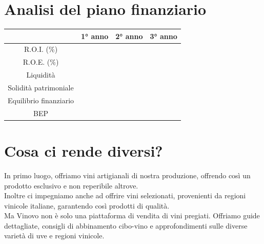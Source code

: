 \documentclass[12pt, a4paper]{article}
\newcommand{\meskip}{\medskip \\}
\begin{document}
\section*{Analisi del piano finanziario}
\begin{tabular}{|c|c|c|c|}
    \hline
                           & 1° anno & 2° anno & 3° anno \\ \hline
    R.O.I. (\%)            &         &         &         \\ \hline
    R.O.E. (\%)            &         &         &         \\ \hline
    Liquidità              &         &         &         \\ \hline
    Solidità patrimoniale  &         &         &         \\ \hline
    Equilibrio finanziario &         &         &         \\ \hline
    BEP                    &         &         &         \\ \hline
\end{tabular}

\section*{Cosa ci rende diversi?}
In primo luogo, offriamo vini artigianali di nostra produzione, offrendo così un prodotto esclusivo e non reperibile altrove.\\
Inoltre ci impegniamo anche ad offrire vini selezionati, provenienti da regioni vinicole italiane, garantendo così prodotti di qualità.\meskip
Ma Vinovo non è solo una piattaforma di vendita di vini pregiati.
Offriamo guide dettagliate, consigli di abbinamento cibo-vino e approfondimenti sulle diverse varietà di uve e regioni vinicole.
\end{document}
